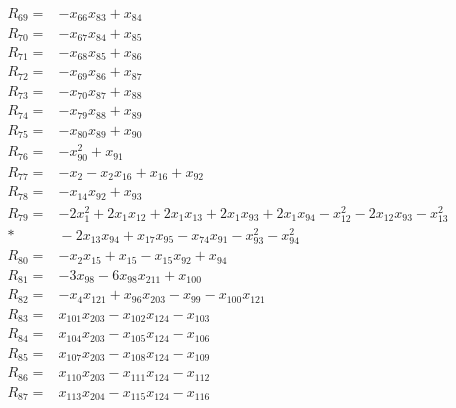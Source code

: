 \begin{align*}
R_{69} ={}& -x_{66}x_{83} + x_{84} \\[4pt]
R_{70} ={}& -x_{67}x_{84} + x_{85} \\[4pt]
R_{71} ={}& -x_{68}x_{85} + x_{86} \\[4pt]
R_{72} ={}& -x_{69}x_{86} + x_{87} \\[4pt]
R_{73} ={}& -x_{70}x_{87} + x_{88} \\[4pt]
R_{74} ={}& -x_{79}x_{88} + x_{89} \\[4pt]
R_{75} ={}& -x_{80}x_{89} + x_{90} \\[4pt]
R_{76} ={}& -x_{90}^{2} + x_{91} \\[4pt]
R_{77} ={}& -x_{2} - x_{2}x_{16} + x_{16} + x_{92} \\[4pt]
R_{78} ={}& -x_{14}x_{92} + x_{93} \\[4pt]
R_{79} ={}& -2x_{1}^{2} + 2x_{1}x_{12} + 2x_{1}x_{13} + 2x_{1}x_{93} + 2x_{1}x_{94} - x_{12}^{2} - 2x_{12}x_{93} - x_{13}^{2} \\*
&{} - 2x_{13}x_{94} + x_{17}x_{95} - x_{74}x_{91} - x_{93}^{2} - x_{94}^{2} \\[4pt]
R_{80} ={}& -x_{2}x_{15} + x_{15} - x_{15}x_{92} + x_{94} \\[4pt]
R_{81} ={}& -3x_{98} - 6x_{98}x_{211} + x_{100} \\[4pt]
R_{82} ={}& -x_{4}x_{121} + x_{96}x_{203} - x_{99} - x_{100}x_{121} \\[4pt]
R_{83} ={}& x_{101}x_{203} - x_{102}x_{124} - x_{103} \\[4pt]
R_{84} ={}& x_{104}x_{203} - x_{105}x_{124} - x_{106} \\[4pt]
R_{85} ={}& x_{107}x_{203} - x_{108}x_{124} - x_{109} \\[4pt]
R_{86} ={}& x_{110}x_{203} - x_{111}x_{124} - x_{112} \\[4pt]
R_{87} ={}& x_{113}x_{204} - x_{115}x_{124} - x_{116} \\[4pt]

\end{align*}

